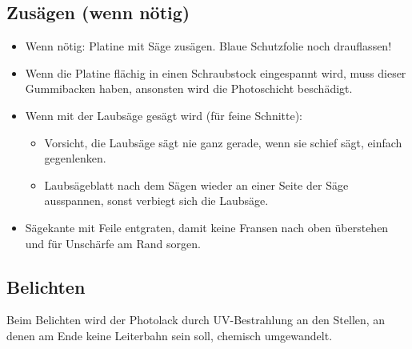 \documentclass{\basedir/fablab-document}
\begin{document}
\subsection{Zusägen (wenn nötig)}
\label{sec:zusaegen}
\begin{itemize}
\item Wenn nötig: Platine mit Säge zusägen. Blaue Schutzfolie noch drauflassen!
\end{itemize}
\begin{itemize}
\item Wenn die Platine flächig in einen Schraubstock eingespannt wird, muss dieser Gummibacken haben, ansonsten wird die Photoschicht beschädigt.
\item Wenn mit der Laubsäge gesägt wird (für feine Schnitte):
	\begin{itemize}
	\item Vorsicht, die Laubsäge sägt nie ganz gerade, wenn sie schief sägt, einfach gegenlenken.
	\item Laubsägeblatt nach dem Sägen wieder an einer Seite der Säge ausspannen, sonst verbiegt sich die Laubsäge.
	\end{itemize}
\item Sägekante mit Feile entgraten, damit keine Fransen nach oben überstehen und für Unschärfe am Rand sorgen.
\end{itemize}
\subsection{Belichten}
\label{sec:belichten}
Beim Belichten wird der Photolack durch UV-Bestrahlung an den Stellen, an denen am Ende keine Leiterbahn sein soll, chemisch umgewandelt.
\end{document}
